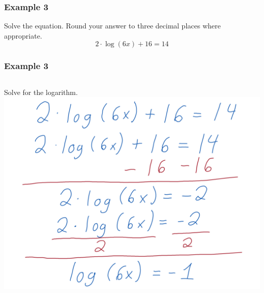 \documentclass[aspectratio=169,17pt]{beamer}
\begin{document}
\begin{frame}[t]
	\frametitle{Example 3}
	Solve the equation. Round your answer to three decimal places where appropriate.
	$$2 \cdot \log\left(6x\right) + 16 = 14$$
\end{frame}

\begin{frame}
	\frametitle{Example 3}
	\begin{columns}
			Solve for the logarithm.
			\includegraphics[width=\textwidth]{logarithmic_equations-work_06.png}
	\end{columns}
\end{frame}
\end{document}
